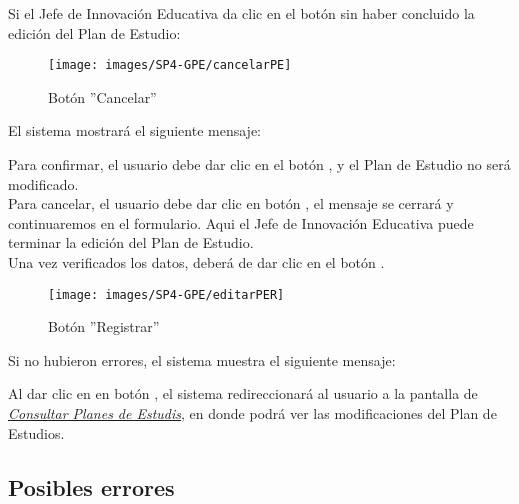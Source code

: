 \newpage
 Si el Jefe de Innovación Educativa da clic en el botón  sin haber concluido la edición del Plan de Estudio:

\begin{figure}[!hbtp]
	\centering
	\hypertarget{cancel2}{\texttt{[image: images/SP4-GPE/cancelarPE]}}
	\caption{Botón ''Cancelar''}
	\label{cancel2}
\end{figure}

El sistema mostrará el siguiente mensaje:

Para confirmar, el usuario debe dar clic en el botón  , y el Plan de Estudio no será modificado.\\

Para cancelar, el usuario debe dar clic en botón  , el mensaje se cerrará y continuaremos en el formulario. Aqui el Jefe de Innovación Educativa puede terminar la edición del Plan de Estudio.\\



\newpage
Una vez verificados los datos, deberá de dar clic en el botón  .
\begin{figure}[!hbtp]
	\centering
	\hypertarget{btnfin}{\texttt{[image: images/SP4-GPE/editarPER]}}
	\caption{Botón ''Registrar''}
	\label{btnfin}
\end{figure}

Si no hubieron errores, el sistema muestra el siguiente mensaje:

Al dar clic en en botón  , el sistema redireccionará al usuario a la pantalla de \hyperlink{consultarPE}{\textit{Consultar Planes de Estudis}}, en donde podrá ver las modificaciones del Plan de Estudios.\\

\subsection{Posibles errores}

